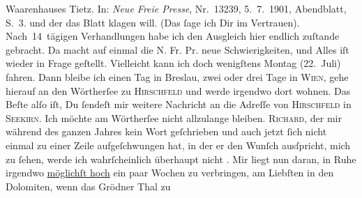 \begin{ledgroupsized}[t]{13cm}
{{{{                        Waarenhauses Tietz}. In: \emph{Neue Freie
                        Presse}, Nr. 13239, 5. 7. 1901,
                     Abendblatt, S. 3.}}}\label{K_L03073-1h} und der das Blatt klagen will. (Das ſage ich Dir im Vertrauen).
               Nach 14 tägigen Verhandlungen habe ich den Ausgleich hier endlich zuſtande gebracht.
               Da macht auf einmal die N. Fr. Pr. neue
               Schwierigkeiten, und Alles iſt {\pb}wieder in Frage
               geſtellt.\pend
           \pstart
           Vielleicht kann ich doch wenigſtens Montag (22. Juli)
               fahren. Dann bleibe ich einen Tag in Breslau,
               zwei oder drei Tage in \textsc{Wien}, gehe hierauf an den Wörtherſee zu \textsc{Hirschfeld} und werde irgendwo dort wohnen. Das Beſte alſo iſt, Du ſendeſt mir weitere
               Nachricht an die Adreſſe von \textsc{Hirschfeld} in \textsc{Seekirn}. Ich möchte am Wörtherſee nicht allzulange
               bleiben. \textsc{Richard}, der mir während des ganzen Jahres kein Wort geſchrieben und auch jetzt ſich
               nicht einmal zu einer Zeile {\pb}aufgeſchwungen hat, in
               der er den Wunſch ausſpricht, mich zu ſehen, werde ich wahrſcheinlich überhaupt nicht
                  \label{K_L03073-2v}\label{K_L03073-2h}.\pend
           \pstart
           Mir liegt nun daran, in Ruhe irgendwo \uline{möglichſt hoch}
               ein paar Wochen zu verbringen, am Liebſten in den Dolomiten, wenn das Grödner Thal zu

\end{ledgroupsized}
